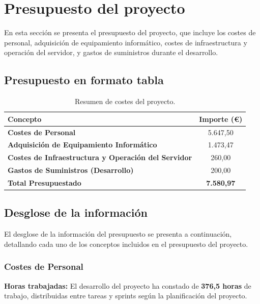 \section{Presupuesto del proyecto}


En esta sección se presenta el presupuesto del proyecto, que incluye los costes de personal, adquisición de equipamiento informático, costes de infraestructura y operación del servidor, y gastos de suministros durante el desarrollo.

\subsection{Presupuesto en formato tabla}

\begin{table}[H]
\centering
\begin{tabular}{|l|c|}
\hline
\textbf{Concepto} & \textbf{Importe (€)} \\ \hline
\textbf{Costes de Personal} & 5.647,50 \\ \hline
\textbf{Adquisición de Equipamiento Informático} & 1.473,47 \\ \hline
\textbf{Costes de Infraestructura y Operación del Servidor} & 260,00 \\ \hline
\textbf{Gastos de Suministros (Desarrollo)} & 200,00 \\ \hline
\textbf{Total Presupuestado} & \textbf{7.580,97} \\ \hline
\end{tabular}
\caption{Resumen de costes del proyecto.}
\label{tab:presupuesto_actualizado}
\end{table}

\subsection{Desglose de la información}

El desglose de la información del presupuesto se presenta a continuación, detallando cada uno de los conceptos incluidos en el presupuesto del proyecto.

\subsubsection{Costes de Personal}

\textbf{Horas trabajadas:} El desarrollo del proyecto ha constado de \textbf{376,5 horas} de trabajo, distribuidas entre tareas y sprints según la planificación del proyecto.

